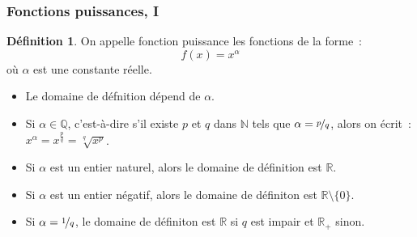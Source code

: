 \documentclass[10pt,notheorems]{beamer}
\theoremstyle{plain}
\theoremstyle{definition} %
\newtheorem{definition}{Définition}
\begin{document}
\begin{frame}
  \frametitle{Fonctions puissances, I}
  \hypertarget{slide_fonctions_puissance_1}{}

  \bigskip

  \begin{definition}
    On appelle fonction puissance les fonctions de la forme~:
    \[
      f(x) = x^{\alpha}
    \]
    où $\alpha$ est une constante réelle.
  \end{definition}

  \bigskip

  \begin{itemize}

  \item Le domaine de défnition dépend de $\alpha$.\newline

  \item Si $\alpha\in\mathbb Q$, c'est-à-dire s'il existe $p$ et $q$ dans $\mathbb N$ tels que $\alpha=\nicefrac{p}{q}$, alors on écrit~: $x^{\alpha} = x^{\frac{p}{q}} = \sqrt[q]{x^p}$.\newline

  \item Si $\alpha$ est un entier naturel, alors le domaine de définition est $\mathbb R$.

  \item Si $\alpha$ est un entier négatif, alors le domaine de définiton est $\mathbb R\setminus \{0\}$.

  \item Si $\alpha=\nicefrac{1}{q}$, le domaine de définiton est $\mathbb R$ si $q$ est impair et $\mathbb R_+$ sinon.

  \end{itemize}

\end{frame}
\end{document}
